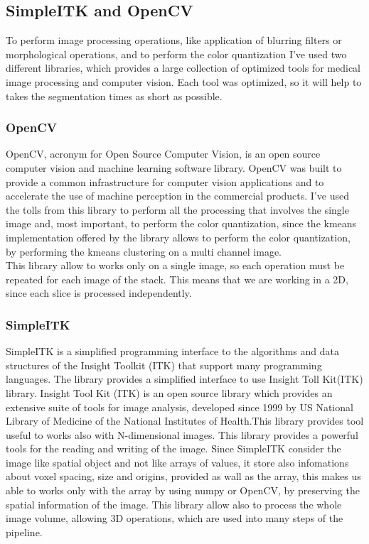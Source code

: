 \documentclass{standalone}
\begin{document}
	
	\subsection{SimpleITK and OpenCV}
	
	To perform image processing operations, like application of blurring filters or morphological operations, and to perform the color quantization I've used two different libraries, which provides a large collection of optimized tools for medical image processing and computer vision. Each tool was optimized, so it will help to takes the segmentation times as short as possible.
	
	\subsubsection*{OpenCV} 
	
	OpenCV, acronym for Open Source Computer Vision,  is an open source computer vision and machine learning software library. OpenCV was built to provide a common infrastructure for computer vision applications and to accelerate the use of machine perception in the commercial products.
	I've used the tolls from this library to perform all the processing that involves the single image and, most important, to perform the color quantization, since the kmeans implementation offered by the library allows to perform the color quantization, by performing the kmeans clustering on a multi channel image.\\
	This library allow to works only on a single image, so each operation must be repeated for each image of the stack. This means that we are working in a 2D, since each slice is processed independently.
	
	\subsubsection*{SimpleITK} 
	
	SimpleITK is a simplified programming interface to the algorithms and data structures of the Insight Toolkit (ITK) that support many programming languages. The library provides a simplified interface to use Insight Toll Kit(ITK) library. 
	Insight Tool Kit (ITK) is an open source library which provides an extensive suite of tools for image analysis, developed since 1999 by US National Library of Medicine of the National Institutes of Health.This library provides tool useful to works also with N-dimensional images. 
	This library provides a powerful tools for the reading and writing of the image. Since SimpleITK consider the image like spatial object and not like arrays of values, it store also infomations about voxel spacing, size and origins, provided as wall as the array, this makes us able to works only with the array by using numpy or OpenCV, by preserving the spatial information of the image. This library allow also to process the whole image volume, allowing 3D operations, which are used into many steps of the pipeline.
	
	 
	
	 
\end{document}
